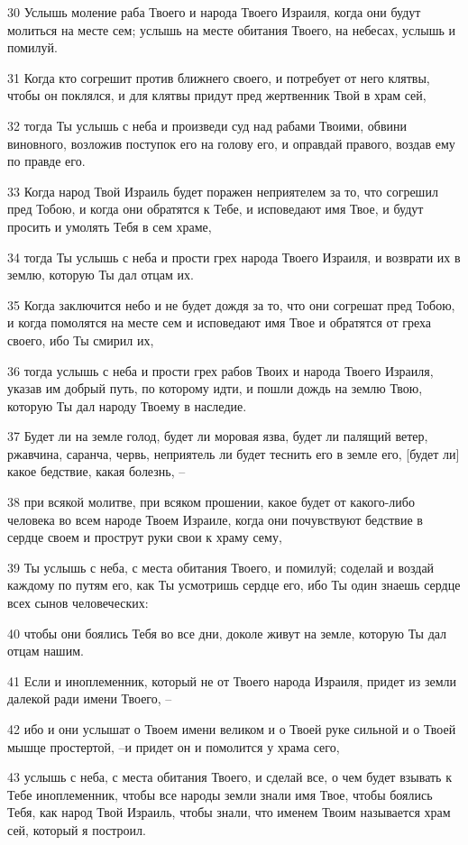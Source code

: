 \par 30 Услышь моление раба Твоего и народа Твоего Израиля, когда они будут молиться на месте сем; услышь на месте обитания Твоего, на небесах, услышь и помилуй.
\par 31 Когда кто согрешит против ближнего своего, и потребует от него клятвы, чтобы он поклялся, и для клятвы придут пред жертвенник Твой в храм сей,
\par 32 тогда Ты услышь с неба и произведи суд над рабами Твоими, обвини виновного, возложив поступок его на голову его, и оправдай правого, воздав ему по правде его.
\par 33 Когда народ Твой Израиль будет поражен неприятелем за то, что согрешил пред Тобою, и когда они обратятся к Тебе, и исповедают имя Твое, и будут просить и умолять Тебя в сем храме,
\par 34 тогда Ты услышь с неба и прости грех народа Твоего Израиля, и возврати их в землю, которую Ты дал отцам их.
\par 35 Когда заключится небо и не будет дождя за то, что они согрешат пред Тобою, и когда помолятся на месте сем и исповедают имя Твое и обратятся от греха своего, ибо Ты смирил их,
\par 36 тогда услышь с неба и прости грех рабов Твоих и народа Твоего Израиля, указав им добрый путь, по которому идти, и пошли дождь на землю Твою, которую Ты дал народу Твоему в наследие.
\par 37 Будет ли на земле голод, будет ли моровая язва, будет ли палящий ветер, ржавчина, саранча, червь, неприятель ли будет теснить его в земле его, [будет ли] какое бедствие, какая болезнь, --
\par 38 при всякой молитве, при всяком прошении, какое будет от какого-либо человека во всем народе Твоем Израиле, когда они почувствуют бедствие в сердце своем и прострут руки свои к храму сему,
\par 39 Ты услышь с неба, с места обитания Твоего, и помилуй; соделай и воздай каждому по путям его, как Ты усмотришь сердце его, ибо Ты один знаешь сердце всех сынов человеческих:
\par 40 чтобы они боялись Тебя во все дни, доколе живут на земле, которую Ты дал отцам нашим.
\par 41 Если и иноплеменник, который не от Твоего народа Израиля, придет из земли далекой ради имени Твоего, --
\par 42 ибо и они услышат о Твоем имени великом и о Твоей руке сильной и о Твоей мышце простертой, --и придет он и помолится у храма сего,
\par 43 услышь с неба, с места обитания Твоего, и сделай все, о чем будет взывать к Тебе иноплеменник, чтобы все народы земли знали имя Твое, чтобы боялись Тебя, как народ Твой Израиль, чтобы знали, что именем Твоим называется храм сей, который я построил.
